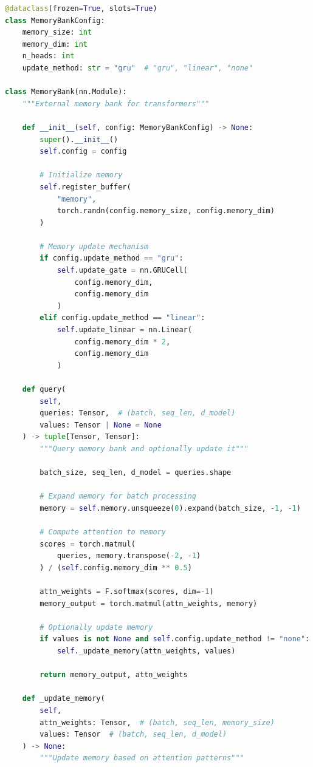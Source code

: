 \documentclass[11pt]{article}
\begin{document}
\begin{lstlisting}[language=Python, caption=Memory-Augmented Transformer]
@dataclass(frozen=True, slots=True)
class MemoryBankConfig:
    memory_size: int
    memory_dim: int
    n_heads: int
    update_method: str = "gru"  # "gru", "linear", "none"

class MemoryBank(nn.Module):
    """External memory bank for transformers"""
    
    def __init__(self, config: MemoryBankConfig) -> None:
        super().__init__()
        self.config = config
        
        # Initialize memory
        self.register_buffer(
            "memory",
            torch.randn(config.memory_size, config.memory_dim)
        )
        
        # Memory update mechanism
        if config.update_method == "gru":
            self.update_gate = nn.GRUCell(
                config.memory_dim, 
                config.memory_dim
            )
        elif config.update_method == "linear":
            self.update_linear = nn.Linear(
                config.memory_dim * 2,
                config.memory_dim
            )
    
    def query(
        self, 
        queries: Tensor,  # (batch, seq_len, d_model)
        values: Tensor | None = None
    ) -> tuple[Tensor, Tensor]:
        """Query memory bank and optionally update it"""
        
        batch_size, seq_len, d_model = queries.shape
        
        # Expand memory for batch processing
        memory = self.memory.unsqueeze(0).expand(batch_size, -1, -1)
        
        # Compute attention to memory
        scores = torch.matmul(
            queries, memory.transpose(-2, -1)
        ) / (self.config.memory_dim ** 0.5)
        
        attn_weights = F.softmax(scores, dim=-1)
        memory_output = torch.matmul(attn_weights, memory)
        
        # Optionally update memory
        if values is not None and self.config.update_method != "none":
            self._update_memory(attn_weights, values)
        
        return memory_output, attn_weights
    
    def _update_memory(
        self, 
        attn_weights: Tensor,  # (batch, seq_len, memory_size)
        values: Tensor  # (batch, seq_len, d_model)
    ) -> None:
        """Update memory based on attention patterns"""
        

\end{lstlisting}
\end{document}
